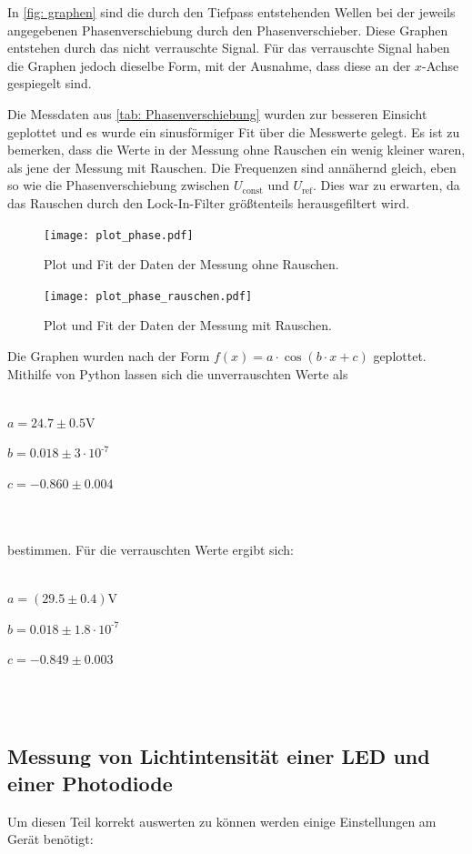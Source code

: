 In \autoref{fig: graphen} sind die durch den Tiefpass entstehenden Wellen bei der jeweils angegebenen Phasenverschiebung durch den Phasenverschieber. Diese Graphen entstehen durch das nicht verrauschte Signal.
Für das verrauschte Signal haben die Graphen jedoch dieselbe Form, mit der Ausnahme, dass diese an der $x$-Achse gespiegelt sind.

Die Messdaten aus \autoref{tab: Phasenverschiebung} wurden zur besseren Einsicht geplottet und es wurde ein sinusförmiger Fit über die Messwerte gelegt.
Es ist zu bemerken, dass die Werte in der Messung ohne Rauschen ein wenig kleiner waren, als jene der Messung mit Rauschen.
Die Frequenzen sind annähernd gleich, eben so wie die Phasenverschiebung zwischen $U_\text{const}$ und $U_\text{ref}$. Dies war zu erwarten, da das Rauschen durch den Lock-In-Filter größtenteils herausgefiltert wird.

\begin{figure}
  \centering
  \texttt{[image: plot\_phase.pdf]}
  \caption{Plot und Fit der Daten der Messung ohne Rauschen.}
  \label{fig:plot_phase}
\end{figure}

\begin{figure}
  \centering
  \texttt{[image: plot\_phase\_rauschen.pdf]}
  \caption{Plot und Fit der Daten der Messung mit Rauschen.}
  \label{fig:plot_phase_rauschen}
\end{figure}

Die Graphen wurden nach der Form $f(x)=a\cdot \cos(b\cdot x+c)$ geplottet. Mithilfe von Python lassen sich die unverrauschten Werte als
\\ \\
\centerline{$a=24.7 \pm 0.5$V}
\centerline{$b=0.018 \pm 3\cdot 10^\text{-7}$}
\centerline{$c=-0.860 \pm 0.004$}
\\ \\
bestimmen. Für die verrauschten Werte ergibt sich:
\\ \\
\centerline{$a=(29.5 \pm 0.4)$V}
\centerline{$b=0.018 \pm 1.8\cdot 10^\text{-7}$}
\centerline{$c=-0.849 \pm 0.003$}
\\ \\
\subsection{Messung von Lichtintensität einer LED und einer Photodiode}

Um diesen Teil korrekt auswerten zu können werden einige Einstellungen am Gerät benötigt:


